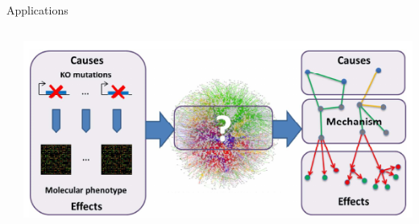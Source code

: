 \documentclass{beamer}
\begin{document}
\begin{frame}{Applications}
\begin{columns}[b]
\begin{column}{0.5\textwidth}
      {\small \cite{DBLP:conf/ilp/Corte-RealD017}}
    \end{column}
    \begin{column}{0.5\textwidth}
      \centering
      \includegraphics[width=\textwidth]{application4.png}
      {\small \cite{de2013phenetic}}
    \end{column}
  \end{columns}
\end{frame}
\end{document}
